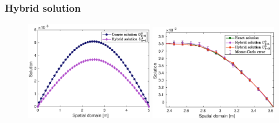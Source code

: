 \documentclass[aspectratio=169]{beamer}
\begin{document}
\begin{frame}
\frametitle{Hybrid solution}
  \begin{figure}
\centering
\includegraphics[width=0.49\textwidth]{image/Coarse_solution_vs_hybrid_n=5}
\includegraphics[width=0.49\textwidth]{image/hybrid_sol_MC_error_bar_zoom_bis} 
\end{figure}
\end{frame}
%
\end{document}
